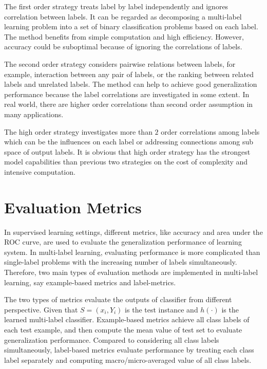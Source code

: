 The first order strategy treats label by label independently and ignores correlation between labels. It can be regarded as decomposing a multi-label learning problem into a set of binary classification problems based on each label. The method benefits from simple computation and high efficiency. However, accuracy could be suboptimal because of ignoring the correlations of labels.

The second order strategy considers pairwise relations between labels, for example, interaction between any pair of labels, or the ranking between related labels and unrelated labels. The method can help to achieve good generalization performance because the label correlations are investigated in some extent. In real world, there are higher order correlations than second order assumption in many applications.

The high order strategy investigates more than $2$ order correlations among labels which can be the influences on each label or addressing connections among sub space of output labels. It is obvious that high order strategy has the strongest model capabilities than previous two strategies on the cost of complexity and intensive computation.

\section{Evaluation Metrics}

In supervised learning settings, different metrics, like accuracy and area under the ROC curve, are used to evaluate the generalization performance of learning system. In multi-label learning, evaluating performance is more complicated  than single-label problems with the increasing number of labels simultaneously. Therefore, two main types of evaluation methods are implemented in multi-label learning, say example-based metrics\citep{ghamrawi2005collective} and label-metrics\citep{tsoumakas2007random}.

The two types of metrics evaluate the outputs of classifier from different perspective. Given that $S = {(x_{i}, Y_{i})}$ is the test instance and $h(\cdot)$ is the learned multi-label classifier. Example-based metrics achieve all class labels of each test example, and then compute the mean value of test set to evaluate generalization performance. Compared to considering all class labels simultaneously, label-based metrics evaluate performance by treating each class label separately and computing macro/micro-averaged value of all class labels.

